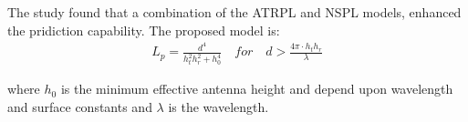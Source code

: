 \large

\begin{minipage}{.45\textwidth}
The study found that a combination of the ATRPL and NSPL models, enhanced the pridiction capability. The proposed model is:
\begin{align*}
L_p = \frac{d^4}{h_t^2 h_r^2+h_0^4}\quad for \quad d > \frac{4\pi\cdot h_th_r}{\lambda}
\end{align*}

where $h_0$ is the minimum effective antenna height and depend upon wavelength and surface constants and $\lambda$ is the wavelength.


\end{minipage}%
\hspace{1cm}
\begin{minipage}{0.45\textwidth}
\begin{center}

\end{center}
\end{minipage}

\vspace{1em}
\begin{minipage}{0.5\textwidth}
\begin{center}

\end{center}
\end{minipage}
\begin{minipage}{0.5\textwidth}
\begin{center}

\end{center}
\end{minipage}

